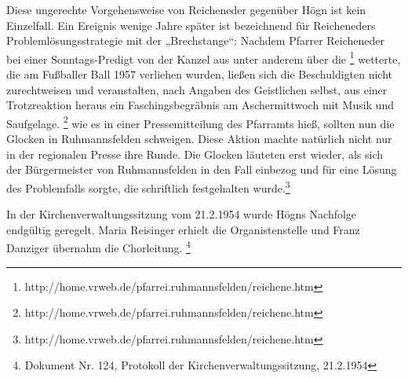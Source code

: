 Diese ungerechte Vorgehensweise von Reicheneder gegenüber Högn ist kein
Einzelfall. Ein Ereignis wenige Jahre später ist bezeichnend für
Reicheneders Problemlösungsstrategie mit der „Brechstange“: Nachdem
Pfarrer Reicheneder bei einer Sonntags-Predigt von der Kanzel aus unter
anderem über die  \footnote{
http://home.vrweb.de/pfarrei.ruhmannsfelden/reichene.htm} wetterte, die
am Fußballer Ball 1957 verliehen wurden, ließen sich die Beschuldigten
nicht zurechtweisen und veranstalten, nach Angaben des Geistlichen
selbst, aus einer Trotzreaktion heraus ein Faschingsbegräbnis am
Aschermittwoch mit Musik und Saufgelage. \footnote{
http://home.vrweb.de/pfarrei.ruhmannsfelden/reichene.htm} wie es in
einer Pressemitteilung des Pfarramts hieß, sollten nun die Glocken in
Ruhmannsfelden schweigen. Diese Aktion machte natürlich nicht nur in
der regionalen Presse ihre Runde. Die Glocken läuteten erst wieder, als
sich der Bürgermeister von Ruhmannsfelden in den Fall einbezog und für
eine Lösung des Problemfalls sorgte, die schriftlich festgehalten
wurde.\footnote{
http://home.vrweb.de/pfarrei.ruhmannsfelden/reichene.htm}

In der Kirchenverwaltungssitzung vom 21.2.1954 wurde Högns Nachfolge
endgültig geregelt. Maria Reisinger erhielt die Organistenstelle und
Franz Danziger übernahm die Chorleitung. \footnote{Dokument Nr. 124,
Protokoll der Kirchenverwaltungssitzung, 21.2.1954}
